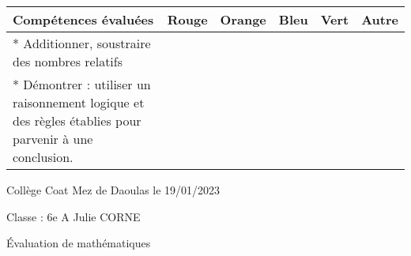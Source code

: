 \documentclass[a4paper,12pt,fleqn]{article}
\begin{document}
\begin{footnotesize}

\begin{center}

\begin{tabular}{|p{120mm}|p{8mm}|p{10mm}|p{8mm}|p{8mm}|p{8mm}|}

\hline
\textbf{Compétences évaluées} & \textbf{Rouge} & \textbf{Orange} & \textbf{Bleu} & \textbf{Vert} & \textbf{Autre} \\
\hline


*  Additionner, soustraire des nombres relatifs  & & & & & \\ 
\hline
*  Démontrer : utiliser un raisonnement logique et des règles établies pour parvenir à une conclusion.  & & & & & \\ 
\hline
\end{tabular}
\end{center}
\end{footnotesize}
 \par 
\medskip
 \par 
\medskip
\newpage
\setcounter{exo}{0}


Collège Coat Mez de Daoulas  \hfill  le 19/01/2023

Classe : 6e A \hfill Julie CORNE

\begin{center}
\begin{LARGE} Évaluation de mathématiques \end{LARGE}
\end{center}

\end{document}

